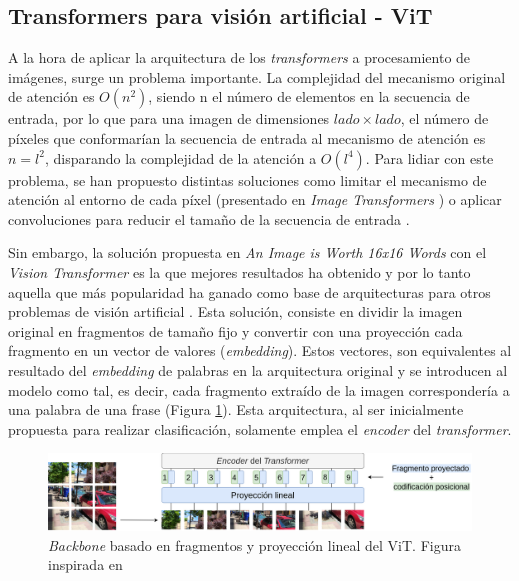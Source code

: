 \subsection{Transformers para visión artificial - ViT}
A la hora de aplicar la arquitectura de los \textit{transformers} a procesamiento de imágenes, surge un problema importante. La complejidad del mecanismo original de atención es $O(n^{2})$, siendo n el número de elementos en la secuencia de entrada, por lo que para una imagen de dimensiones $lado \times lado$, el número de píxeles que conformarían la secuencia de entrada al mecanismo de atención es $n = l^2$, disparando la complejidad de la atención a $O(l^{4})$. Para lidiar con este problema, se han propuesto distintas soluciones como limitar el mecanismo de atención al entorno de cada píxel (presentado en \textit{Image Transformers} \cite{image_transformer}) o aplicar convoluciones para reducir el tamaño de la secuencia de entrada \cite{detrfacebookdetectiontransformers}. 

Sin embargo, la solución propuesta en \textit{An Image is Worth 16x16 Words} con el \textit{Vision Transformer} \cite{image16x16words} es la que mejores resultados ha obtenido y por lo tanto aquella que más popularidad ha ganado como base de arquitecturas para otros problemas de visión artificial \cite{visiontransformersDPT, bhat2020adabins, chen2021transunet, liu2021Swin}. Esta solución, consiste en dividir la imagen original en fragmentos de tamaño fijo y convertir con una proyección cada fragmento en un vector de valores (\textit{embedding}). Estos vectores, son equivalentes al resultado del \textit{embedding} de palabras en la arquitectura original y se introducen al modelo como tal, es decir, cada fragmento extraído de la imagen correspondería a una palabra de una frase (Figura \ref{fig:vit}). Esta arquitectura, al ser inicialmente propuesta para realizar clasificación, solamente emplea el \textit{encoder} del \textit{transformer}.

\begin{figure}[H]
\centering
\includegraphics[width=1\linewidth]{imagenes/vit.png} 
\captionsetup{width=.8\linewidth}
\caption{\textit{Backbone} basado en fragmentos y proyección lineal del ViT. Figura inspirada en \cite{image16x16words}}
\label{fig:vit}
\end{figure}

